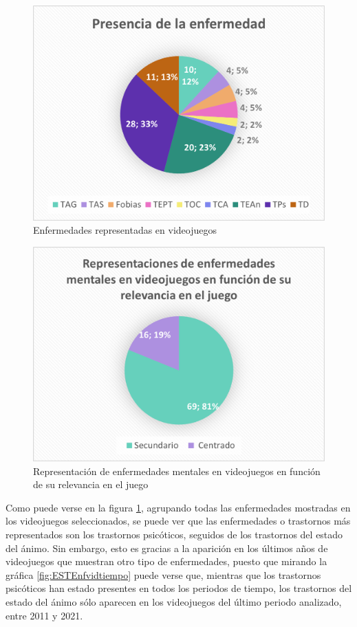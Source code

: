 \documentclass[12pt, a4paper,twoside,titlepage]{book}
\begin{document}
\begin{figure}
    \centering
    \includegraphics[width=.8\linewidth]{Graficas estudio/G2; PresenciaEnf.png}
    \caption{Enfermedades representadas en videojuegos}
    \label{fig:ESTEnfvid}
\end{figure}


\begin{figure}
    \centering
    \includegraphics[width=.8\linewidth]{Graficas estudio/G3; RepresentSecun.png}
    \caption{Representación de enfermedades mentales en videojuegos en función de su relevancia en el juego}
    \label{fig:ESTRelevancia}
\end{figure}


Como puede verse en la figura \ref{fig:ESTEnfvid}, agrupando todas las enfermedades mostradas en los videojuegos seleccionados, se puede ver que las enfermedades o trastornos más representados son los trastornos psicóticos, seguidos de los trastornos del estado del ánimo. Sin embargo, esto es gracias a la aparición en los últimos años de videojuegos que muestran otro tipo de enfermedades, puesto que mirando la gráfica \ref{fig:ESTEnfvidtiempo} puede verse que, mientras que los trastornos psicóticos han estado presentes en todos los periodos de tiempo, los trastornos del estado del ánimo sólo aparecen en los videojuegos del último periodo analizado, entre 2011 y 2021. 
\end{document}
